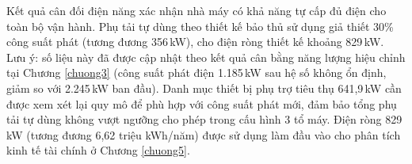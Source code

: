 \documentclass[../main.tex]{subfiles}
\begin{document}
Kết quả cân đối điện năng xác nhận nhà máy có khả năng tự cấp đủ điện cho toàn bộ vận hành. Phụ tải tự dùng theo thiết kế bảo thủ sử dụng giả thiết 30\% công suất phát (tương đương 356\,kW), cho điện ròng thiết kế khoảng 829\,kW. Lưu ý: số liệu này đã được cập nhật theo kết quả cân bằng năng lượng hiệu chỉnh tại Chương \ref{chuong3} (công suất phát điện 1.185\,kW sau hệ số không ổn định, giảm so với 2.245\,kW ban đầu). Danh mục thiết bị phụ trợ tiêu thụ 641,9\,kW cần được xem xét lại quy mô để phù hợp với công suất phát mới, đảm bảo tổng phụ tải tự dùng không vượt ngưỡng cho phép trong cấu hình 3 tổ máy. Điện ròng 829\,kW (tương đương 6,62 triệu kWh/năm) được sử dụng làm đầu vào cho phân tích kinh tế tài chính ở Chương \ref{chuong5}.
\end{document}

